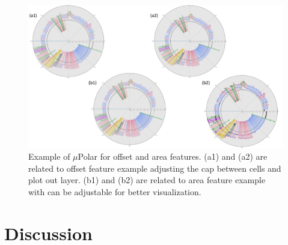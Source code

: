 \documentclass[conference]{IEEEtran}
\begin{document}
\begin{figure}
\centering
\includegraphics[width=\textwidth,height=10 cm]{Patterns/area_offset.pdf}
\caption{ Example of $\mu$Polar for offset and area features. (a1) and (a2) are related to offset feature example adjusting the cap between cells and plot out layer. (b1) and (b2) are related to area feature example with can be adjustable for better visualization.}
\label{fig:areaoff}
\end{figure}



\section{Discussion}
\end{document}

